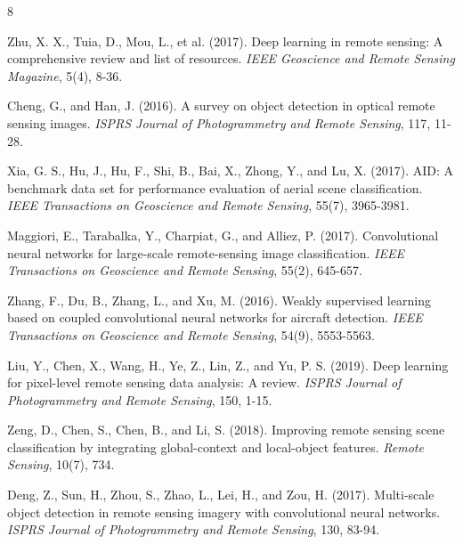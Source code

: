\documentclass[12pt,a4paper]{article}
\begin{document}

\begin{thebibliography}{8}

Zhu, X. X., Tuia, D., Mou, L., et al. (2017). Deep learning in remote sensing: A comprehensive review and list of resources. \emph{IEEE Geoscience and Remote Sensing Magazine}, 5(4), 8-36.

Cheng, G., and Han, J. (2016). A survey on object detection in optical remote sensing images. \emph{ISPRS Journal of Photogrammetry and Remote Sensing}, 117, 11-28.

Xia, G. S., Hu, J., Hu, F., Shi, B., Bai, X., Zhong, Y., and Lu, X. (2017). AID: A benchmark data set for performance evaluation of aerial scene classification. \emph{IEEE Transactions on Geoscience and Remote Sensing}, 55(7), 3965-3981.

Maggiori, E., Tarabalka, Y., Charpiat, G., and Alliez, P. (2017). Convolutional neural networks for large-scale remote-sensing image classification. \emph{IEEE Transactions on Geoscience and Remote Sensing}, 55(2), 645-657.

Zhang, F., Du, B., Zhang, L., and Xu, M. (2016). Weakly supervised learning based on coupled convolutional neural networks for aircraft detection. \emph{IEEE Transactions on Geoscience and Remote Sensing}, 54(9), 5553-5563.

Liu, Y., Chen, X., Wang, H., Ye, Z., Lin, Z., and Yu, P. S. (2019). Deep learning for pixel-level remote sensing data analysis: A review. \emph{ISPRS Journal of Photogrammetry and Remote Sensing}, 150, 1-15.

Zeng, D., Chen, S., Chen, B., and Li, S. (2018). Improving remote sensing scene classification by integrating global-context and local-object features. \emph{Remote Sensing}, 10(7), 734.

Deng, Z., Sun, H., Zhou, S., Zhao, L., Lei, H., and Zou, H. (2017). Multi-scale object detection in remote sensing imagery with convolutional neural networks. \emph{ISPRS Journal of Photogrammetry and Remote Sensing}, 130, 83-94.

\end{thebibliography}
\end{document}
